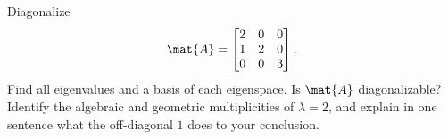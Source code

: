 \begin{exercise}
\label{ch24:ex-3x3}
Diagonalize
\[
  \mat{A} = \begin{bmatrix} 2 & 0 & 0 \\ 1 & 2 & 0 \\ 0 & 0 & 3 \end{bmatrix}.
\]
Find all eigenvalues and a basis of each eigenspace. Is $\mat{A}$ diagonalizable?
Identify the algebraic and geometric multiplicities of $\lambda = 2$, and explain
in one sentence what the off-diagonal $1$ does to your conclusion.
\end{exercise}
